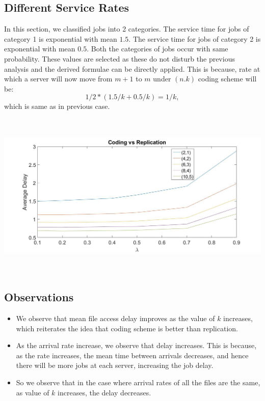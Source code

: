 \documentclass{article}
\begin{document}
\subsection{Different Service Rates}

In this section, we classified jobs into 2 categories. The service time for jobs of category 1 is exponential with mean $1.5$. The service time for jobs of category 2 is exponential with mean $0.5$.
Both the categories of jobs occur with same probability. These values are selected as these do not disturb the previous analysis and the derived formulae can be directly applied. This is because, rate at which a server will now move from $m+1$ to $m$ under $(n.k)$ coding scheme will be: 
$$ 1/2*(1.5/k + 0.5/k) =  1/k, $$ which is same as in previous case. 

\includegraphics[width = 15cm, height = 8cm]{result2.jpg}

\subsection{Observations}
\begin{itemize}
	\item We observe that mean file access delay improves as the value of $k$ increases, which reiterates the idea that coding scheme is better than replication.
	\item As the arrival rate increase, we observe that delay increases. This is because, as the rate increases, the mean time between arrivals decreases, and hence there will be more jobs at each server, increasing the job delay.
	\item So we observe that in the case where arrival rates of all the files are the same, as value of $k$ increases, the delay decreases. 
\end{itemize}
\end{document}
